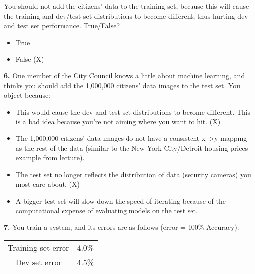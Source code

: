 You should not add the citizens’ data to the training set, because this will cause the training and dev/test set distributions to become different, thus hurting dev and test set performance. True/False?
\begin{itemize}
    \item True
    \item False (X)
\end{itemize}
\textbf{6.} One member of the City Council knows a little about machine learning, and thinks you should add the 1,000,000 citizens’ data images to the test set. You object because:
\begin{itemize}
    \item This would cause the dev and test set distributions to become different. This is a bad idea because you’re not aiming where you want to hit. (X)
    \item The 1,000,000 citizens’ data images do not have a consistent x-->y mapping as the rest of the data (similar to the New York City/Detroit housing prices example from lecture).
    \item The test set no longer reflects the distribution of data (security cameras) you most care about. (X)
    \item A bigger test set will slow down the speed of iterating because of the computational expense of evaluating models on the test set.
\end{itemize}
\textbf{7.} You train a system, and its errors are as follows (error = 100\%-Accuracy):
\begin{center}
\begin{tabular}{ |c|c| }
 \hline
 Training set error & 4.0\% \\
 Dev set error & 4.5\% \\
 \hline
\end{tabular}
\end{center}

